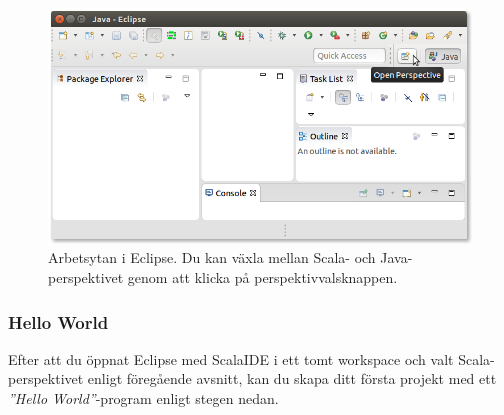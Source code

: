 \begin{figure}
\centering
\includegraphics[width=1.0\textwidth]{../img/eclipse/eclipse-open-perspective.png}
\caption{Arbetsytan i Eclipse. Du kan växla mellan Scala- och Java-perspektivet genom att klicka på perspektivvalsknappen.}
\label{fig:appendix:eclipse:open-perspective}
\end{figure}

\subsubsection{Hello World}\label{subsubsection:eclipse:hello-world}

Efter att du öppnat Eclipse med ScalaIDE i ett tomt workspace och valt Scala-perspektivet enligt föregående avsnitt, kan du skapa ditt första projekt med ett \textit{''Hello World''}-program enligt stegen nedan.

